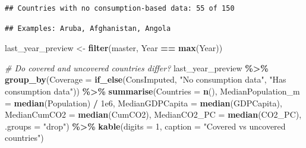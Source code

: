 \documentclass[
]{article}
\newenvironment{Shaded}{\begin{snugshade}}{\end{snugshade}}
\newcommand{\AttributeTok}[1]{\textcolor[rgb]{0.13,0.29,0.53}{#1}}
\newcommand{\CommentTok}[1]{\textcolor[rgb]{0.56,0.35,0.01}{\textit{#1}}}
\newcommand{\DecValTok}[1]{\textcolor[rgb]{0.00,0.00,0.81}{#1}}
\newcommand{\FloatTok}[1]{\textcolor[rgb]{0.00,0.00,0.81}{#1}}
\newcommand{\FunctionTok}[1]{\textcolor[rgb]{0.13,0.29,0.53}{\textbf{#1}}}
\newcommand{\NormalTok}[1]{#1}
\newcommand{\OtherTok}[1]{\textcolor[rgb]{0.56,0.35,0.01}{#1}}
\newcommand{\SpecialCharTok}[1]{\textcolor[rgb]{0.81,0.36,0.00}{\textbf{#1}}}
\newcommand{\StringTok}[1]{\textcolor[rgb]{0.31,0.60,0.02}{#1}}
\begin{document}
\begin{verbatim}
## Countries with no consumption-based data: 55 of 150
\end{verbatim}

\begin{Shaded}
\end{Shaded}

\begin{verbatim}
## Examples: Aruba, Afghanistan, Angola
\end{verbatim}

\begin{Shaded}
\begin{Highlighting}[]
\NormalTok{last\_year\_preview }\OtherTok{\textless{}{-}} \FunctionTok{filter}\NormalTok{(master, Year }\SpecialCharTok{==} \FunctionTok{max}\NormalTok{(Year))}

\CommentTok{\# Do covered and uncovered countries differ?}
\NormalTok{last\_year\_preview }\SpecialCharTok{\%\textgreater{}\%}
  \FunctionTok{group\_by}\NormalTok{(}\AttributeTok{Coverage =} \FunctionTok{if\_else}\NormalTok{(ConsImputed, }\StringTok{"No consumption data"}\NormalTok{,}
                              \StringTok{"Has consumption data"}\NormalTok{)) }\SpecialCharTok{\%\textgreater{}\%}
  \FunctionTok{summarise}\NormalTok{(}\AttributeTok{Countries =} \FunctionTok{n}\NormalTok{(),}
            \AttributeTok{MedianPopulation\_m =} \FunctionTok{median}\NormalTok{(Population) }\SpecialCharTok{/} \FloatTok{1e6}\NormalTok{,}
            \AttributeTok{MedianGDPCapita =} \FunctionTok{median}\NormalTok{(GDPCapita),}
            \AttributeTok{MedianCumCO2 =} \FunctionTok{median}\NormalTok{(CumCO2),}
            \AttributeTok{MedianCO2\_PC =} \FunctionTok{median}\NormalTok{(CO2\_PC),}
            \AttributeTok{.groups =} \StringTok{"drop"}\NormalTok{) }\SpecialCharTok{\%\textgreater{}\%}
  \FunctionTok{kable}\NormalTok{(}\AttributeTok{digits =} \DecValTok{1}\NormalTok{, }\AttributeTok{caption =} \StringTok{"Covered vs uncovered countries"}\NormalTok{)}
\end{Highlighting}
\end{Shaded}
\end{document}
